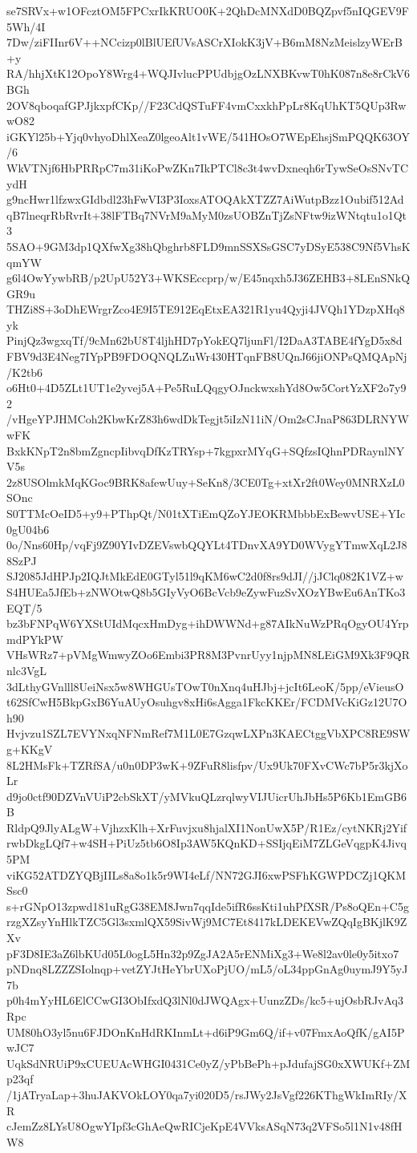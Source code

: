 se7SRVx+w1OFcztOM5FPCxrIkKRUO0K+2QhDcMNXdD0BQZpvf5nIQGEV9F5Wh/4I
7Dw/ziFIInr6V++NCcizp0lBlUEfUVsASCrXIokK3jV+B6mM8NzMeislzyWErB+y
RA/hhjXtK12OpoY8Wrg4+WQJIvlucPPUdbjgOzLNXBKvwT0hK087n8e8rCkV6BGh
2OV8qboqafGPJjkxpfCKp//F23CdQSTuFF4vmCxxkhPpLr8KqUhKT5QUp3RwwO82
iGKYl25b+Yjq0vhyoDhlXeaZ0lgeoAlt1vWE/541HOsO7WEpEhsjSmPQQK63OY/6
WkVTNjf6HbPRRpC7m31iKoPwZKn7IkPTCl8c3t4wvDxneqh6rTywSeOsSNvTCydH
g9ncHwr1lfzwxGIdbdl23hFwVI3P3IoxsATOQAkXTZZ7AiWutpBzz1Oubif512Ad
qB7lneqrRbRvrIt+38lFTBq7NVrM9aMyM0zsUOBZnTjZsNFtw9izWNtqtu1o1Qt3
5SAO+9GM3dp1QXfwXg38hQbghrb8FLD9mnSSXSsGSC7yDSyE538C9Nf5VhsKqmYW
g6l4OwYywbRB/p2UpU52Y3+WKSEccprp/w/E45nqxh5J36ZEHB3+8LEnSNkQGR9u
THZi8S+3oDhEWrgrZco4E9I5TE912EqEtxEA321R1yu4Qyji4JVQh1YDzpXHq8yk
PinjQz3wgxqTf/9cMn62bU8T4ljhHD7pYokEQ7ljunFl/I2DaA3TABE4fYgD5x8d
FBV9d3E4Neg7IYpPB9FDOQNQLZuWr430HTqnFB8UQnJ66jiONPsQMQApNj/K2tb6
o6Ht0+4D5ZLt1UT1e2yvej5A+Pe5RuLQqgyOJnckwxshYd8Ow5CortYzXF2o7y92
/vHgeYPJHMCoh2KbwKrZ83h6wdDkTegjt5iIzN11iN/Om2sCJnaP863DLRNYWwFK
BxkKNpT2n8bmZgncpIibvqDfKzTRYsp+7kgpxrMYqG+SQfzsIQhnPDRaynlNYV5s
2z8USOlmkMqKGoc9BRK8afewUuy+SeKn8/3CE0Tg+xtXr2ft0Wey0MNRXzL0SOnc
S0TTMcOeID5+y9+PThpQt/N01tXTiEmQZoYJEOKRMbbbExBewvUSE+YIc0gU04b6
0o/Nns60Hp/vqFj9Z90YIvDZEVswbQQYLt4TDnvXA9YD0WVygYTmwXqL2J88SzPJ
SJ2085JdHPJp2IQJtMkEdE0GTyl51l9qKM6wC2d0f8rs9dJI//jJClq082K1VZ+w
S4HUEa5JfEb+zNWOtwQ8b5GIyVyO6BcVcb9eZywFuzSvXOzYBwEu6AnTKo3EQT/5
bz3bFNPqW6YXStUIdMqcxHmDyg+ihDWWNd+g87AIkNuWzPRqOgyOU4YrpmdPYkPW
VHsWRz7+pVMgWmwyZOo6Embi3PR8M3PvnrUyy1njpMN8LEiGM9Xk3F9QRnlc3VgL
3dLthyGVnlll8UeiNsx5w8WHGUsTOwT0nXnq4uHJbj+jcIt6LeoK/5pp/eVieusO
t62SfCwH5BkpGxB6YuAUyOsuhgv8xHi6sAgga1FkcKKEr/FCDMVcKiGz12U7Oh90
Hvjvzu1SZL7EVYNxqNFNmRef7M1L0E7GzqwLXPn3KAECtggVbXPC8RE9SWg+KKgV
8L2HMsFk+TZRfSA/u0n0DP3wK+9ZFuR8lisfpv/Ux9Uk70FXvCWc7bP5r3kjXoLr
d9jo0ctf90DZVnVUiP2cbSkXT/yMVkuQLzrqlwyVIJUicrUhJbHs5P6Kb1EmGB6B
RldpQ9JlyALgW+VjhzxKlh+XrFuvjxu8hjalXI1NonUwX5P/R1Ez/cytNKRj2Yif
rwbDkgLQf7+w4SH+PiUz5tb6O8Ip3AW5KQnKD+SSIjqEiM7ZLGeVqgpK4Jivq5PM
viKG52ATDZYQBjIILs8a8o1k5r9WI4eLf/NN72GJI6xwPSFhKGWPDCZj1QKMSsc0
s+rGNpO13zpwd181uRgG38EM8Jwn7qqIde5ifR6ssKti1uhPfXSR/Ps8oQEn+C5g
rzgXZsyYnHlkTZC5Gl3sxmlQX59SivWj9MC7Et8417kLDEKEVwZQqIgBKjlK9ZXv
pF3D8IE3aZ6lbKUd05L0ogL5Hn32p9ZgJA2A5rENMiXg3+We8l2av0le0y5itxo7
pNDnq8LZZZSIolnqp+vetZYJtHeYbrUXoPjUO/mL5/oL34ppGnAg0uymJ9Y5yJ7b
p0h4mYyHL6ElCCwGI3ObIfxdQ3lNl0dJWQAgx+UunzZDs/kc5+ujOsbRJvAq3Rpc
UM80hO3yl5nu6FJDOnKnHdRKInmLt+d6iP9Gm6Q/if+v07FmxAoQfK/gAI5PwJC7
UqkSdNRUiP9xCUEUAcWHGI0431Ce0yZ/yPbBePh+pJdufajSG0xXWUKf+ZMp23qf
/1jATryaLap+3huJAKVOkLOY0qa7yi020D5/rsJWy2JsVgf226KThgWkImRIy/XR
cJemZz8LYsU8OgwYIpf3cGhAeQwRICjeKpE4VVksASqN73q2VFSo5l1N1v48fHW8
